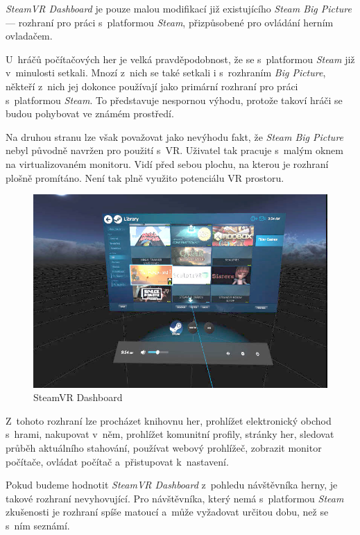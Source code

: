 \emph{SteamVR Dashboard} je pouze malou modifikací již existujícího
\emph{Steam Big Picture} --- rozhraní pro práci s~platformou
\emph{Steam}, přizpůsobené pro ovládání herním ovladačem.

U~hráčů počítačových her je velká pravděpodobnost, že se s~platformou
\emph{Steam} již v~minulosti setkali. Mnozí z~nich se také setkali i
s~rozhraním \emph{Big Picture}, někteří z~nich jej dokonce používají jako
primární rozhraní pro práci s~platformou \emph{Steam}. To představuje nespornou výhodu, protože takoví hráči se budou pohybovat ve
známém prostředí.

Na druhou stranu lze však považovat jako nevýhodu fakt, že \emph{Steam
Big Picture} nebyl původně navržen pro použití s~VR. Uživatel tak pracuje
s~malým oknem na virtualizovaném monitoru. Vidí před sebou plochu, na
kterou je rozhraní plošně promítáno. Není tak plně využito potenciálu VR
prostoru.

\begin{figure}[h!]
\centering
\includegraphics[width=12cm]{src/assets/steamvr-library.jpg}
\caption{SteamVR Dashboard \autocite{tomshardw}}
\end{figure}

Z~tohoto rozhraní lze procházet knihovnu her, prohlížet elektronický
obchod s~hrami, nakupovat v~něm, prohlížet komunitní profily, stránky
her, sledovat průběh aktuálního stahování, používat webový prohlížeč,
zobrazit monitor počítače, ovládat počítač a~přistupovat k~nastavení.

Pokud budeme hodnotit \emph{SteamVR Dashboard} z~pohledu návštěvníka
herny, je takové rozhraní nevyhovující. Pro návštěvníka, který nemá
s~platformou \emph{Steam} zkušenosti je rozhraní spíše matoucí a~může
vyžadovat určitou dobu, než se s~ním seznámí. 

